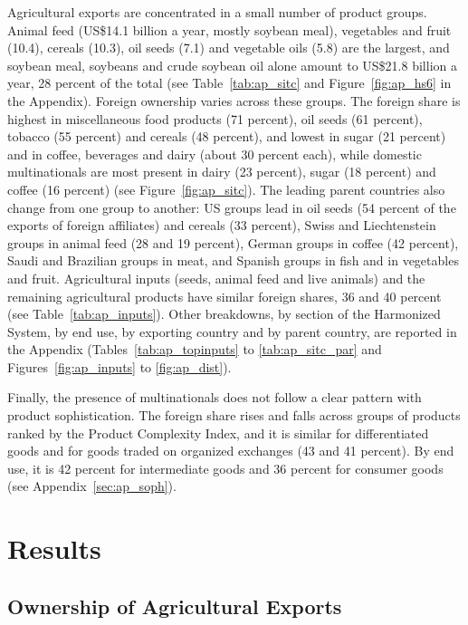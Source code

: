 \documentclass[11pt,a4paper]{article}
\begin{document}
Agricultural exports are concentrated in a small number of product groups. Animal feed (US\$14.1 billion a
year, mostly soybean meal), vegetables and fruit (10.4), cereals (10.3), oil seeds (7.1) and
vegetable oils (5.8) are the largest, and soybean meal, soybeans and crude soybean oil alone amount
to US\$21.8 billion a year, 28 percent of the total (see Table~\ref{tab:ap_sitc} and
Figure~\ref{fig:ap_hs6} in the Appendix). Foreign ownership varies across these groups. The
foreign share is highest in miscellaneous food products (71 percent), oil seeds (61 percent),
tobacco (55 percent) and cereals (48 percent), and lowest in sugar (21 percent) and in coffee,
beverages and dairy (about 30 percent each), while domestic multinationals are most present in
dairy (23 percent), sugar (18 percent) and coffee (16 percent) (see Figure~\ref{fig:ap_sitc}). The
leading parent countries also change from one group to another: US groups lead in oil seeds (54
percent of the exports of foreign affiliates) and cereals (33 percent), Swiss and Liechtenstein
groups in animal feed (28 and 19 percent), German groups in coffee (42 percent), Saudi and
Brazilian groups in meat, and Spanish groups in fish and in vegetables and fruit. Agricultural
inputs (seeds, animal feed and live animals) and the remaining agricultural products have similar
foreign shares, 36 and 40 percent (see Table~\ref{tab:ap_inputs}). Other breakdowns, by section of
the Harmonized System, by end use, by exporting country and by parent country, are reported in the
Appendix (Tables~\ref{tab:ap_topinputs} to \ref{tab:ap_sitc_par} and Figures~\ref{fig:ap_inputs}
to \ref{fig:ap_dist}).

Finally, the presence of multinationals does not follow a clear pattern with product
sophistication. The foreign share rises and falls across groups of products ranked by the Product
Complexity Index, and it is similar for differentiated goods and for goods traded on organized
exchanges (43 and 41 percent). By end use, it is 42 percent for intermediate goods and 36 percent
for consumer goods (see Appendix~\ref{sec:ap_soph}).

\section{Results}\label{sec:results}
\subsection{Ownership of Agricultural Exports}\label{sec:owners}
\end{document}
